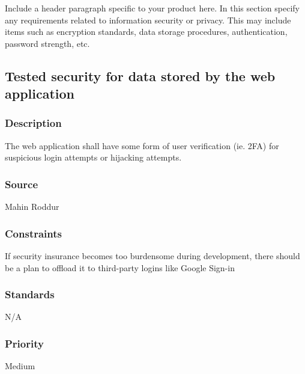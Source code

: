 Include a header paragraph specific to your product here. In this section specify any requirements related to information security or privacy. This may include items such as encryption standards, data storage procedures, authentication, password strength, etc.

\subsection{Tested security for data stored by the web application}
\subsubsection{Description}
The web application shall have some form of user verification (ie. 2FA) for suspicious login attempts or hijacking attempts. 
\subsubsection{Source}
Mahin Roddur
\subsubsection{Constraints}
If security insurance becomes too burdensome during development, there should be a plan to offload it to third-party logins like Google Sign-in
\subsubsection{Standards}
N/A
\subsubsection{Priority}
Medium
